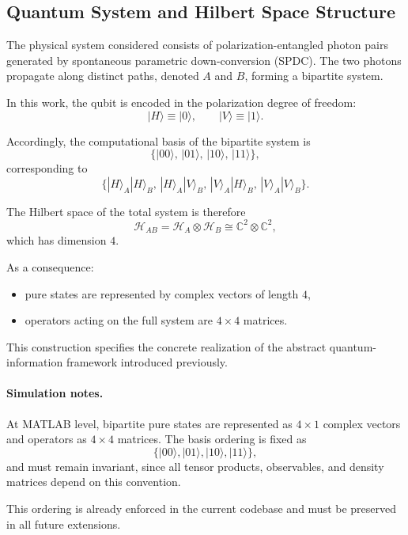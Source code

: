 \documentclass[a4paper]{article}
\begin{document}
\subsection{Quantum System and Hilbert Space Structure}

The physical system considered consists of polarization-entangled photon pairs generated by spontaneous parametric down-conversion (SPDC). The two photons propagate along distinct paths, denoted \(A\) and \(B\), forming a bipartite system.

In this work, the qubit is encoded in the polarization degree of freedom:
\[
|H\rangle \equiv |0\rangle,
\qquad
|V\rangle \equiv |1\rangle.
\]

Accordingly, the computational basis of the bipartite system is
\[
\{
|00\rangle,\,
|01\rangle,\,
|10\rangle,\,
|11\rangle
\},
\]
corresponding to
\[
\{
|H\rangle_A |H\rangle_B,\,
|H\rangle_A |V\rangle_B,\,
|V\rangle_A |H\rangle_B,\,
|V\rangle_A |V\rangle_B
\}.
\]

The Hilbert space of the total system is therefore
\[
\mathcal{H}_{AB} = \mathcal{H}_A \otimes \mathcal{H}_B
\cong \mathbb{C}^2 \otimes \mathbb{C}^2,
\]
which has dimension \(4\).

As a consequence:
\begin{itemize}
    \item pure states are represented by complex vectors of length \(4\),
    \item operators acting on the full system are \(4 \times 4\) matrices.
\end{itemize}

This construction specifies the concrete realization of the abstract quantum-information framework introduced previously.

\paragraph{Simulation notes.}
At MATLAB level, bipartite pure states are represented as \(4 \times 1\) complex vectors and operators as \(4 \times 4\) matrices. The basis ordering is fixed as
\[
\{|00\rangle,|01\rangle,|10\rangle,|11\rangle\},
\]
and must remain invariant, since all tensor products, observables, and density matrices depend on this convention.

This ordering is already enforced in the current codebase and must be preserved in all future extensions.

\end{document}
